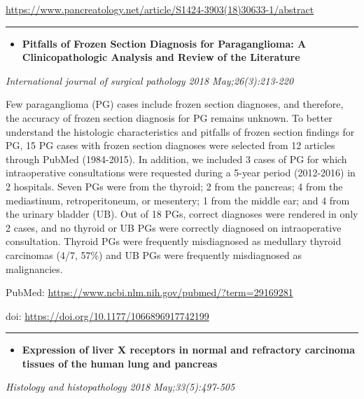 \documentclass[]{article}
\providecommand{\tightlist}{%
  \setlength{\itemsep}{0pt}\setlength{\parskip}{0pt}}
\begin{document}
\url{https://www.pancreatology.net/article/S1424-3903(18)30633-1/abstract}

\begin{center}\rule{0.5\linewidth}{\linethickness}\end{center}

\begin{itemize}
\tightlist
\item
  \textbf{Pitfalls of Frozen Section Diagnosis for Paraganglioma: A
  Clinicopathologic Analysis and Review of the Literature}
\end{itemize}

\emph{International journal of surgical pathology 2018
May;26(3):213-220}

Few paraganglioma (PG) cases include frozen section diagnoses, and
therefore, the accuracy of frozen section diagnosis for PG remains
unknown. To better understand the histologic characteristics and
pitfalls of frozen section findings for PG, 15 PG cases with frozen
section diagnoses were selected from 12 articles through PubMed
(1984-2015). In addition, we included 3 cases of PG for which
intraoperative consultations were requested during a 5-year period
(2012-2016) in 2 hospitals. Seven PGs were from the thyroid; 2 from the
pancreas; 4 from the mediastinum, retroperitoneum, or mesentery; 1 from
the middle ear; and 4 from the urinary bladder (UB). Out of 18 PGs,
correct diagnoses were rendered in only 2 cases, and no thyroid or UB
PGs were correctly diagnosed on intraoperative consultation. Thyroid PGs
were frequently misdiagnosed as medullary thyroid carcinomas (4/7, 57\%)
and UB PGs were frequently misdiagnosed as malignancies.

PubMed: \url{https://www.ncbi.nlm.nih.gov/pubmed/?term=29169281}

doi: \url{https://doi.org/10.1177/1066896917742199}

{}

{}

\begin{center}\rule{0.5\linewidth}{\linethickness}\end{center}

\begin{itemize}
\tightlist
\item
  \textbf{Expression of liver X receptors in normal and refractory
  carcinoma tissues of the human lung and pancreas}
\end{itemize}

\emph{Histology and histopathology 2018 May;33(5):497-505}
\end{document}
